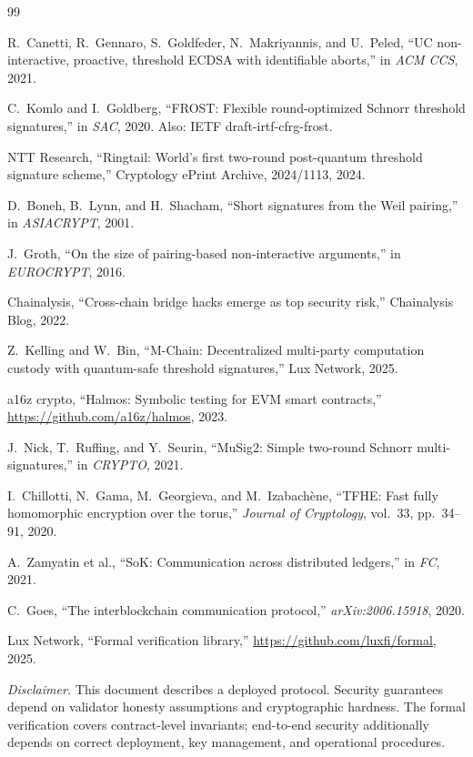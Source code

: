 \documentclass[11pt]{article}
\begin{document}
\begin{thebibliography}{99}

R.~Canetti, R.~Gennaro, S.~Goldfeder, N.~Makriyannis, and U.~Peled,
``UC non-interactive, proactive, threshold ECDSA with identifiable aborts,''
in \emph{ACM CCS}, 2021.

C.~Komlo and I.~Goldberg,
``FROST: Flexible round-optimized Schnorr threshold signatures,''
in \emph{SAC}, 2020.
Also: IETF draft-irtf-cfrg-frost.

NTT Research,
``Ringtail: World's first two-round post-quantum threshold signature scheme,''
Cryptology ePrint Archive, 2024/1113, 2024.

D.~Boneh, B.~Lynn, and H.~Shacham,
``Short signatures from the Weil pairing,''
in \emph{ASIACRYPT}, 2001.

J.~Groth,
``On the size of pairing-based non-interactive arguments,''
in \emph{EUROCRYPT}, 2016.

Chainalysis,
``Cross-chain bridge hacks emerge as top security risk,''
Chainalysis Blog, 2022.

Z.~Kelling and W.~Bin,
``M-Chain: Decentralized multi-party computation custody with quantum-safe threshold signatures,''
Lux Network, 2025.

a16z crypto,
``Halmos: Symbolic testing for EVM smart contracts,''
\url{https://github.com/a16z/halmos}, 2023.

J.~Nick, T.~Ruffing, and Y.~Seurin,
``MuSig2: Simple two-round Schnorr multi-signatures,''
in \emph{CRYPTO}, 2021.

I.~Chillotti, N.~Gama, M.~Georgieva, and M.~Izabach\`{e}ne,
``TFHE: Fast fully homomorphic encryption over the torus,''
\emph{Journal of Cryptology}, vol.~33, pp.~34--91, 2020.

A.~Zamyatin et al.,
``SoK: Communication across distributed ledgers,''
in \emph{FC}, 2021.

C.~Goes,
``The interblockchain communication protocol,''
\emph{arXiv:2006.15918}, 2020.

Lux Network,
``Formal verification library,''
\url{https://github.com/luxfi/formal}, 2025.

\end{thebibliography}

\vspace{1em}
\noindent\textit{Disclaimer.} This document describes a deployed protocol. Security guarantees depend on validator honesty assumptions and cryptographic hardness. The formal verification covers contract-level invariants; end-to-end security additionally depends on correct deployment, key management, and operational procedures.
\end{document}
